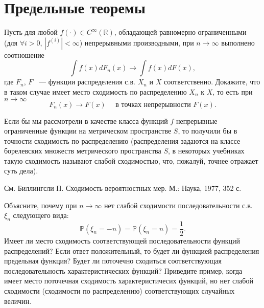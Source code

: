 \section{Предельные теоремы}
\label{zb4}


\begin{problem}
\label{contin}
Пусть для любой $f(\cdot) \in C^{\infty}\left(\mathbb{R}\right)$, обладающей равномерно ограниченными (для  $\forall i > 0$, $|f^{(i)}| <  \infty$) непрерывными производными,  при $n\to\infty$ выполнено соотношение 
 \[
 \int f(x) dF_n(x) \rightarrow \int f(x) dF(x),
 \]
\noindent где $F_n$, $F$ ~--- функции распределения с.в. $X_n$ и $X$ соответственно. Докажите, что в таком случае имеет место сходимость по распределению  $X_n$ к $X$, то есть при $n \to\infty$
\begin{equation*}
F_n(x) \to F(x)\quad\text{ в точках непрерывности }F(x).
\end{equation*}
 
\end{problem}
\begin{remark}
Если бы мы рассмотрели в качестве класса функций $f$ непрерывные ограниченные функции на метрическом пространстве $S$, то получили бы в точности сходимость по распределению (распределения задаются на классе борелевских множеств метрического пространства $S$, в некоторых учебниках такую сходимость называют слабой сходимостью, что, пожалуй, точнее отражает суть дела). 

См. Биллингсли П. Сходимость вероятностных мер. М.: Наука, 1977, 352 с.
\end{remark}

\begin{problem}

Объясните, почему при $n\to\infty$ нет слабой сходимости последовательности с.в. $\xi_n$  следующего вида:
\begin{equation*}
\mathbb{P} (\xi_n = -n) = \mathbb{P} (\xi_n = n) = \frac{1}{2}. 
\end{equation*}
Имеет ли место сходимость соответствующей последовательности функций распределений? Если ответ положительный, то будет ли функцией распределения предельная функция? Будет ли поточечно сходиться соответствующая последовательность характеристических функций? Приведите пример, когда имеет место поточечная сходимость характеристичесих функций, но нет слабой сходимости (сходимости по распределению) соответствующих случайных величин.
\end{problem}


